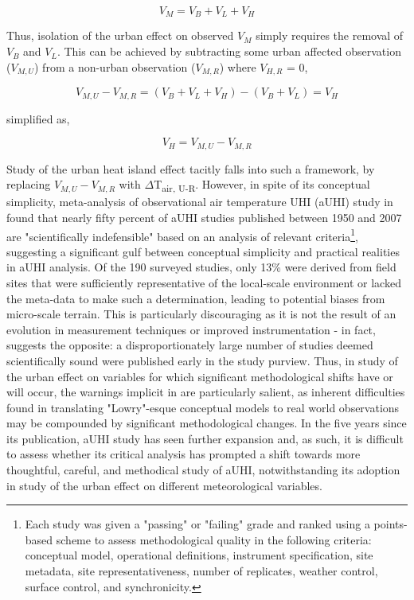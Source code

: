 \begin{equation}
	V_M = V_B + V_L + V_H
\end{equation}

Thus, isolation of the urban effect on observed $V_M$ simply requires the removal of $V_B$ and $V_L$. This can be achieved by subtracting some urban affected observation ($V_{M, U}$) from a non-urban observation ($V_{M, R}$) where $V_{H, R}$ = 0,

\begin{equation}
V_{M, U} - V_{M, R} = (V_B + V_L + V_H) - (V_B + V_L) = V_H
\end{equation}

\noindent simplified as,

\begin{equation}
	V_H = V_{M, U} - V_{M, R}
\end{equation}

Study of the urban heat island effect tacitly falls into such a framework, by replacing $V_{M, U} - V_{M, R}$ with $\Delta$T\textsubscript{air, U-R}. However, in spite of its conceptual simplicity, meta-analysis of observational air temperature UHI (aUHI) study in \citet{Stewart2011} found that nearly fifty percent of aUHI studies published between 1950 and 2007 are "scientifically indefensible" based on an analysis of relevant criteria\footnote{Each study was given a "passing" or "failing" grade and ranked using a points-based scheme to assess methodological quality in the following criteria: conceptual model, operational definitions, instrument specification, site metadata, site representativeness, number of replicates, weather control, surface control, and synchronicity.}, suggesting a significant gulf between conceptual simplicity and practical realities in aUHI analysis. Of the 190 surveyed studies, only 13\% were derived from field sites that were sufficiently representative of the local-scale environment or lacked the meta-data to make such a determination, leading to potential biases from micro-scale terrain. This is particularly discouraging as it is not the result of an evolution in measurement techniques or improved instrumentation - in fact, \citet{Stewart2011} suggests the opposite: a disproportionately large number of studies deemed scientifically sound were published early in the study purview. Thus, in study of the urban effect on variables for which significant methodological shifts have or will occur, the warnings implicit in \citet{Stewart2011} are particularly salient, as inherent difficulties found in translating "Lowry"-esque conceptual models to real world observations may be compounded by significant methodological changes. In the five years since its publication, aUHI study has seen further expansion and, as such, it is difficult to assess whether its critical analysis has prompted a shift towards more thoughtful, careful, and methodical study of aUHI, notwithstanding its adoption in study of the urban effect on different meteorological variables.

